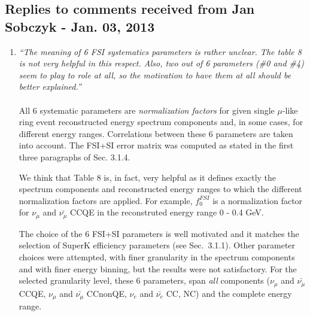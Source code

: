 \subsection{
  Replies to comments received from Jan Sobczyk - Jan. 03, 2013 }

\begin{enumerate}

\vspace{5 mm}
\item
{\em
  ``The meaning of 6 FSI systematics parameters is rather unclear. The
    table 8 is not very helpful in this respect. Also, two out of 6
    parameters (\#0 and \#4) seem to play to role at all, so the motivation
    to have them at all should be better explained.''
}\\
\\
All 6 systematic parameters are {\em normalization factors} for given single $\mu$-like ring event
reconstructed energy spectrum components and,
in some cases, for different energy ranges.
Correlations between these 6 parameters are taken into account.
The FSI+SI error matrix was computed as stated in the first three paragraphs of Sec. 3.1.4.

We think that Table 8 is, in fact, very helpful as it defines exactly
the spectrum components and reconstructed energy ranges to which the different
normalization factors are applied.
For example, $f_{0}^{FSI}$ is a normalization factor for $\nu_{\mu}$ and $\bar{\nu_{\mu}}$ CCQE
in the reconstruted energy range 0 - 0.4 GeV.

The choice of the 6 FSI+SI parameters is well motivated
and it matches the selection of SuperK efficiency parameters (see Sec.\ 3.1.1).
Other parameter choices were attempted, with finer granularity in the
spectrum components and with finer energy binning, but the results were not satisfactory.
For the selected granularity level, these 6 parameters, span {\em all} components 
($\nu_{\mu}$ and $\bar{\nu_{\mu}}$ CCQE, $\nu_{\mu}$ and $\bar{\nu_{\mu}}$ CCnonQE, 
$\nu_{e}$ and $\bar{\nu_{e}}$ CC, NC) and the complete energy range.


\end{enumerate}
